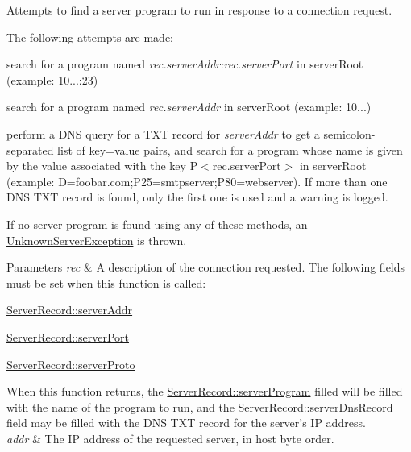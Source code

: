 \-Attempts to find a server program to run in response to a connection request. 

\-The following attempts are made\-:
\begin{DoxyEnumerate}
\item search for a program named {\itshape rec.\-server\-Addr\-:rec.\-server\-Port\/} in {\ttfamily server\-Root} (example\-: 10...\-:23)
\item search for a program named {\itshape rec.\-server\-Addr\/} in {\ttfamily server\-Root} (example\-: 10...)
\item perform a \-D\-N\-S query for a \-T\-X\-T record for {\itshape server\-Addr\/} to get a semicolon-\/separated list of key=value pairs, and search for a program whose name is given by the value associated with the key \-P$<$rec.\-server\-Port$>$ in {\ttfamily server\-Root} (example\-: \-D=foobar.\-com;\-P25=smtpserver;\-P80=webserver). \-If more than one \-D\-N\-S \-T\-X\-T record is found, only the first one is used and a warning is logged.
\end{DoxyEnumerate}\-If no server program is found using any of these methods, an \hyperlink{classNERD_1_1ConnectionServer_1_1UnknownServerException}{\-Unknown\-Server\-Exception} is thrown. 
\begin{DoxyParams}{\-Parameters}
{\em rec} & \-A description of the connection requested. \-The following fields must be set when this function is called\-:
\begin{DoxyItemize}
\item \hyperlink{structNERD_1_1ConnectionServer_1_1ServerRecord_a741796c62f55fc2d3b7ac5807d4bfdf8}{\-Server\-Record\-::server\-Addr}
\item \hyperlink{structNERD_1_1ConnectionServer_1_1ServerRecord_a8eeda51ef462eeabb3d66b130fe70e56}{\-Server\-Record\-::server\-Port}
\item \hyperlink{structNERD_1_1ConnectionServer_1_1ServerRecord_a8e253a76e9dbd9eaf239f09ff9d1e69f}{\-Server\-Record\-::server\-Proto}
\end{DoxyItemize}\-When this function returns, the \hyperlink{structNERD_1_1ConnectionServer_1_1ServerRecord_a9bacaaa47cedda53feb069fbc1be8b8c}{\-Server\-Record\-::server\-Program} filled will be filled with the name of the program to run, and the \hyperlink{structNERD_1_1ConnectionServer_1_1ServerRecord_a1272b0f4ca611ecc8c2b2b76c75c5f91}{\-Server\-Record\-::server\-Dns\-Record} field may be filled with the \-D\-N\-S \-T\-X\-T record for the server's \-I\-P address. \\
\hline
{\em addr} & \-The \-I\-P address of the requested server, in host byte order. \\
\hline
\end{DoxyParams}


